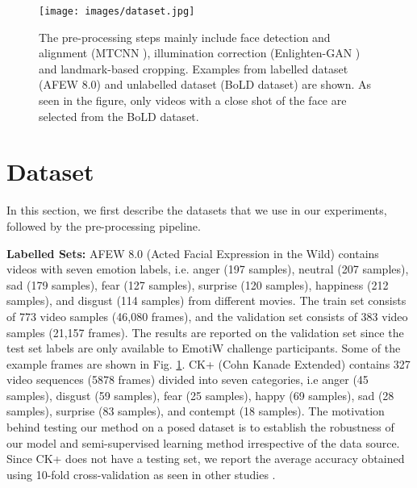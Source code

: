\documentclass[runningheads]{llncs}
\begin{document}
\begin{figure}[t!]
\centering
\texttt{[image: images/dataset.jpg]}
\caption{The pre-processing steps mainly include face detection and alignment (MTCNN \cite{zhang2016joint}), illumination correction (Enlighten-GAN \cite{jiang2019enlightengan}) and landmark-based cropping. Examples from labelled dataset (AFEW 8.0) and unlabelled dataset (BoLD dataset) are shown. As seen in the figure, only videos with a close shot of the face are selected from the BoLD dataset.}
\label{fig:dataset}
\end{figure}


\section{Dataset} \label{sec: dataset}
In this section, we first describe the datasets that we use in our experiments, followed by the pre-processing pipeline. \newline

\noindent\textbf{Labelled Sets:} AFEW 8.0 (Acted Facial Expression in the Wild) \cite{dhall2012collecting} contains videos with seven emotion labels, i.e. anger (197 samples), neutral (207 samples), sad (179 samples), fear (127 samples), surprise (120 samples), happiness (212 samples), and disgust (114 samples) from different movies. The train set consists of 773 video samples (46,080 frames), and the validation set consists of 383 video samples (21,157 frames). The results are reported on the validation set since the test set labels are only available to EmotiW challenge \cite{dhall2019emotiw} participants. Some of the example frames are shown in Fig. \ref{fig:dataset}. CK+ (Cohn Kanade Extended) \cite{lucey2010extended} contains 327 video sequences (5878 frames) divided into seven categories, i.e anger (45 samples), disgust (59 samples), fear (25 samples), happy (69 samples), sad (28 samples), surprise (83 samples), and contempt (18 samples). The motivation behind testing our method on a posed dataset is to establish the robustness of our model and semi-supervised learning method irrespective of the data source. Since CK+ does not have a testing set, we report the average accuracy obtained using 10-fold cross-validation as seen in other studies \cite{meng2019frame,zhang2017facial,jung2015joint,cai2018island,sikka2016lomo}. \newline
\end{document}

